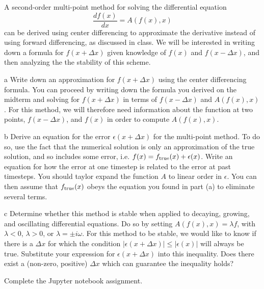 \documentclass[]{homework}
\begin{document}

\begin{problem}{1}
  A second-order multi-point method for solving the differential equation
  \[ \frac{d f(x)}{d x} = A(f(x),x) \]
  can be derived using center differencing to approximate the derivative
  instead of using forward differencing, as discussed in class. We will be
  interested in writing down a formula for $f(x+\Delta x)$ given
  knowledge of $f(x)$ and $f(x-\Delta x)$, and then analyzing the
  the stability of this scheme.
  \begin{subproblem}{a}
    Write down an approximation for $f(x+\Delta x)$ using the center differencing formula.
    You can proceed by writing down the formula you derived on the
    midterm and solving for $f(x+\Delta x)$ in terms of $f(x-\Delta x)$ and $A(f(x), x)$.
    For this method, we will therefore need information about the function
    at two points, $f(x-\Delta x)$, and $f(x)$ in order to compute $A(f(x), x)$.
  \end{subproblem}
  \begin{subproblem}{b}
    Derive an equation for the error $\epsilon(x+\Delta x)$ for the multi-point
    method. To do so, use the fact that the numerical solution is only an
    approximation of the true solution, and so includes some error, i.e.
    $f(x) = f_{\rm true}(x) + \epsilon(x)$. Write an equation for how the
    error at one timestep is related to the error at past timesteps.
    You should taylor expand the function $A$ to linear order in $\epsilon$.
    You can then assume that $f_{\rm true}(x)$ obeys the equation you found in part (a)
    to eliminate several terms.
  \end{subproblem}
  \begin{subproblem}{c}
    Determine whether this method is stable when applied to
    decaying, growing, and oscillating differential equations.
    Do so by setting $A(f(x), x) = \lambda f$, with $\lambda <0$,
    $\lambda > 0$, or $\lambda = \pm i \omega$.
    For this method to be stable, we would like to know if there is
    a $\Delta x$ for which the condition
    $|\epsilon(x+\Delta x)| \le |\epsilon(x)|$ will always be true.
    Substitute your expression for $\epsilon(x+\Delta x)$ into this
    inequality.
    Does there exist a (non-zero, positive)
    $\Delta x$ which can guarantee the inequality holds?\\
  \end{subproblem}

\end{problem}


\begin{problem}{2}
  Complete the Jupyter notebook assignment.
\end{problem}
\end{document}
